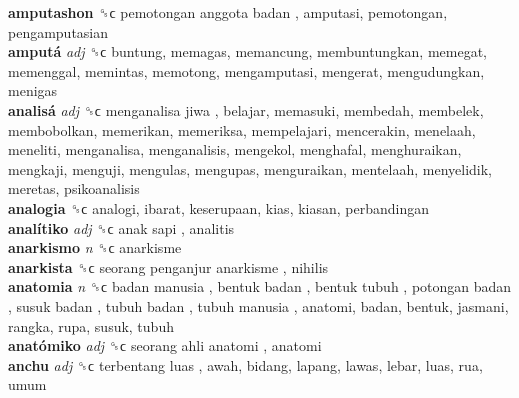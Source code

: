\textbf{amputashon} ␝ϲ   pemotongan anggota badan , amputasi, pemotongan, pengamputasian  \\
\textbf{amputá} \emph{adj}  ␝ϲ  buntung, memagas, memancung, membuntungkan, memegat, memenggal, memintas, memotong, mengamputasi, mengerat, mengudungkan, menigas  \\
\textbf{analisá} \emph{adj}  ␝ϲ   menganalisa jiwa , belajar, memasuki, membedah, membelek, membobolkan, memerikan, memeriksa, mempelajari, mencerakin, menelaah, meneliti, menganalisa, menganalisis, mengekol, menghafal, menghuraikan, mengkaji, menguji, mengulas, mengupas, menguraikan, mentelaah, menyelidik, meretas, psikoanalisis  \\
\textbf{analogia} ␝ϲ  analogi, ibarat, keserupaan, kias, kiasan, perbandingan  \\
\textbf{analítiko} \emph{adj}  ␝ϲ   anak sapi , analitis  \\
\textbf{anarkismo} \emph{n}  ␝ϲ  anarkisme  \\
\textbf{anarkista} ␝ϲ   seorang penganjur anarkisme , nihilis  \\
\textbf{anatomia} \emph{n}  ␝ϲ   badan manusia ,  bentuk badan ,  bentuk tubuh ,  potongan badan ,  susuk badan ,  tubuh badan ,  tubuh manusia , anatomi, badan, bentuk, jasmani, rangka, rupa, susuk, tubuh  \\
\textbf{anatómiko} \emph{adj}  ␝ϲ   seorang ahli anatomi , anatomi  \\
\textbf{anchu} \emph{adj}  ␝ϲ   terbentang luas , awah, bidang, lapang, lawas, lebar, luas, rua, umum  \\
